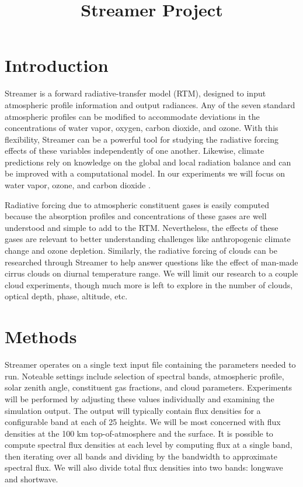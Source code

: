 \documentclass[twocol]{ametsoc}
\title{Streamer Project}
\affiliation{}
\begin{document}
\maketitle


%

\section{Introduction}
Streamer is a forward radiative-transfer model (RTM), designed to input atmospheric profile information and output radiances. Any of the seven standard atmospheric profiles can be modified to accommodate deviations in the concentrations of water vapor, oxygen, carbon dioxide, and ozone. With this flexibility, Streamer can be a powerful tool for studying the radiative forcing effects of these variables independently of one another. Likewise, climate predictions rely on knowledge on the global and local radiation balance and can be improved with a computational model. In our experiments we will focus on water vapor, ozone, and carbon dioxide \citep{Key:1998}.

Radiative forcing due to atmospheric constituent gases is easily computed because the absorption profiles and concentrations of these gases are well understood and simple to add to the RTM. Nevertheless, the effects of these gases are relevant to better understanding challenges like anthropogenic climate change and ozone depletion. Similarly, the radiative forcing of clouds can be researched through Streamer to help answer questions like the effect of man-made cirrus clouds on diurnal temperature range. We will limit our research to a couple cloud experiments, though much more is left to explore in the number of clouds, optical depth, phase, altitude, etc.
\section{Methods}
Streamer operates on a single text input file containing the parameters needed to run. Noteable settings include selection of spectral bands, atmospheric profile, solar zenith angle, constituent gas fractions, and cloud parameters. Experiments will be performed by adjusting these values individually and examining the simulation output. The output will typically contain flux densities for a configurable band at each of 25 heights. We will be most concerned with flux densities at the 100 km top-of-atmosphere and the surface. It is possible to compute spectral flux densities at each level by computing flux at a single band, then iterating over all bands and dividing by the bandwidth to approximate spectral flux. We will also divide total flux densities into two bands: longwave and shortwave.
\end{document}

